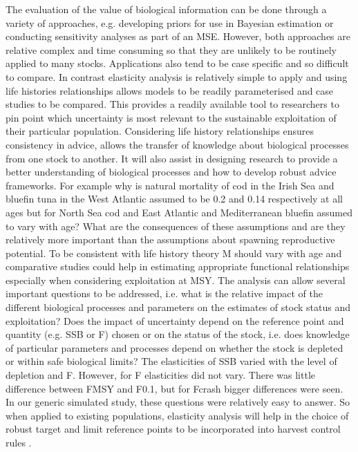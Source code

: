 \documentclass{pnastwo}
\begin{document}
\begin{article}
The evaluation of the value of biological information can be done through a variety of approaches, e.g. developing priors for use in Bayesian estimation or conducting sensitivity analyses as part of an MSE. However, both approaches are relative complex and time consuming so that they are unlikely to be routinely applied to many stocks. Applications also tend to be case specific and so diﬃcult to compare. In contrast elasticity analysis is relatively simple to apply and using life histories relationships allows models to be readily parameterised and case studies to be compared. This provides a readily available tool to researchers to pin point which uncertainty is most relevant to the sustainable exploitation of their particular population.
Considering life history relationships ensures consistency in advice, allows the transfer of knowledge about biological processes from one stock to another. It will also assist in designing research to provide a better understanding of biological processes and how to develop robust advice frameworks. For example why is natural mortality of cod in the Irish Sea and bluefin tuna in the West Atlantic assumed to be 0.2 and 0.14 respectively at all ages but for North Sea cod and East Atlantic and Mediterranean bluefin assumed to vary with age? What are the consequences of these assumptions and are they relatively more important than the assumptions about spawning reproductive potential. To be consistent with life history theory M should vary with age and comparative studies could help in estimating appropriate functional relationships especially when considering exploitation at MSY.
The analysis can allow several important questions to be addressed, i.e. what is the relative impact of the diﬀerent biological processes and parameters on the estimates of stock status and exploitation? Does the impact of uncertainty depend on the reference point and quantity (e.g. SSB or F) chosen or on the status of the stock, i.e. does knowledge of particular parameters and processes depend on whether the stock is depleted or within safe biological limits? The elasticities of SSB varied with the level of depletion and F. However, for F elasticities did not vary. There was little diﬀerence between FMSY and F0.1, but for Fcrash bigger diﬀerences were seen. In our generic simulated study, these questions were relatively easy to answer. So when applied to existing populations, elasticity analysis  will help in the choice of robust target and limit reference points to be incorporated into harvest control rules .


\end{article}
\end{document}
